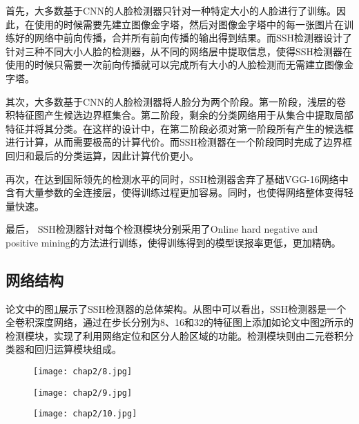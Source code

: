 首先，大多数基于CNN的人脸检测器只针对一种特定大小的人脸进行了训练。因此，在使用的时候需要先建立图像金字塔，然后对图像金字塔中的每一张图片在训练好的网络中前向传播，合并所有前向传播的输出得到结果。而SSH检测器设计了针对三种不同大小人脸的检测器，从不同的网络层中提取信息，使得SSH检测器在使用的时候只需要一次前向传播就可以完成所有大小的人脸检测而无需建立图像金字塔。

其次，大多数基于CNN的人脸检测器将人脸分为两个阶段。第一阶段，浅层的卷积特征图产生候选边界框集合。第二阶段，剩余的分类网络用于从集合中提取局部特征并将其分类。在这样的设计中，在第二阶段必须对第一阶段所有产生的候选框进行计算，从而需要极高的计算代价。而SSH检测器在一个阶段同时完成了边界框回归和最后的分类运算，因此计算代价更小。

再次，在达到国际领先的检测水平的同时，SSH检测器舍弃了基础VGG-16网络\cite{simonyan2014very}中含有大量参数的全连接层，使得训练过程更加容易。同时，也使得网络整体变得轻量快速。

最后， SSH检测器针对每个检测模块分别采用了Online hard negative and positive mining\cite{shrivastava2016training}的方法进行训练，使得训练得到的模型误报率更低，更加精确。

\subsection{网络结构}

论文\parencite{najibi2017ssh}中的图\ref{fig:ssh:arc}展示了SSH检测器的总体架构。从图中可以看出，SSH检测器是一个全卷积深度网络，通过在步长分别为8、16和32的特征图上添加如论文\parencite{najibi2017ssh}中图\ref{fig:ssh:det}所示的检测模块，实现了利用网络定位和区分人脸区域的功能。检测模块则由二元卷积分类器和回归运算模块组成。

\begin{figure}[!htp]
	\centering
	\texttt{[image: chap2/8.jpg]}
	\label{fig:ssh:arc}
\end{figure}

\begin{figure}[!htp]
	\centering
	\texttt{[image: chap2/9.jpg]}
	\label{fig:ssh:det}
\end{figure}

\begin{figure}[!htp]
	\centering
	\texttt{[image: chap2/10.jpg]}
	\label{fig:ssh:context}
\end{figure}

